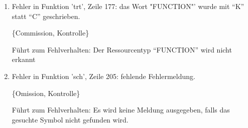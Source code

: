 \begin{enumerate}
\item Fehler in Funktion 'trt', Zeile 177: das Wort "FUNCTION"' wurde 
mit "`K"' statt "`C"' geschrieben. 

\{Commission, Kontrolle\}

F\"uhrt zum Fehlverhalten: Der Ressourcentyp "`FUNCTION"' wird nicht erkannt



\item Fehler in Funktion 'sch', Zeile 205: fehlende Fehlermeldung.

\{Omission, Kontrolle\}

F\"uhrt zum Fehlverhalten: Es wird keine Meldung ausgegeben, falls 
das gesuchte Symbol nicht gefunden wird.	

\end{enumerate}

